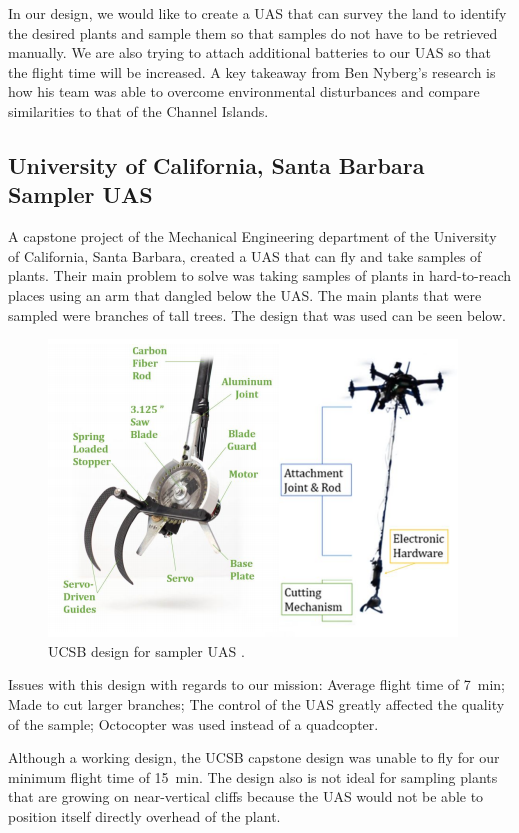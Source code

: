 \documentclass{wrcecapstone}
\begin{document}
In our design, we would like to create a UAS that can survey the land to identify the desired plants and sample them so that samples do not have to be retrieved manually.  We are also trying to attach additional batteries to our UAS so that the flight time will be increased. A key takeaway from Ben Nyberg’s research is how his team was able to overcome environmental disturbances and compare similarities to that of the Channel Islands. 

\subsection{University of California, Santa Barbara Sampler UAS}
A capstone project of the Mechanical Engineering department of the University of California, Santa Barbara, created a UAS that can fly and take samples of plants.  Their main problem to solve was taking samples of plants in hard-to-reach places using an arm that dangled below the UAS.  The main plants that were sampled were branches of tall trees.  The design that was used can be seen below.
\begin{figure}
\caption{UCSB design for sampler UAS \cite{dantonio2018sampler}.}
\label{fig:3.2}
\begin{center}
\includegraphics[width=0.8\columnwidth]{figures/fig32-ucsb.png}
\end{center}
\end{figure}

Issues with this design with regards to our mission: Average flight time of \SI{7}{\minute}; Made to cut larger branches; The control of the UAS greatly affected the quality of the sample; Octocopter was used instead of a quadcopter.

Although a working design, the UCSB capstone design was unable to fly for our minimum flight time of \SI{15}{\minute}.  The design also is not ideal for sampling plants that are growing on near-vertical cliffs because the UAS would not be able to position itself directly overhead of the plant. 
\end{document}
